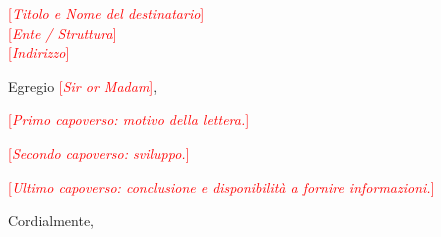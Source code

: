 \documentclass[italian,11pt]{dmifblueletter}
\newcommand{\fillin}[1]{\textcolor{red}{[\textit{#1}]}}
\begin{document}

\begin{letter}{\fillin{Titolo e Nome del destinatario} \\
               \fillin{Ente / Struttura} \\
               \fillin{Indirizzo}}

\subject{\fillin{oggetto della lettera}}

\opening{Egregio \fillin{Sir or Madam},}

\fillin{Primo capoverso: motivo della lettera.}

\fillin{Secondo capoverso: sviluppo.}

\fillin{Ultimo capoverso: conclusione e disponibilità a fornire informazioni.}

\closing{Cordialmente,}


\end{letter}
\end{document}
